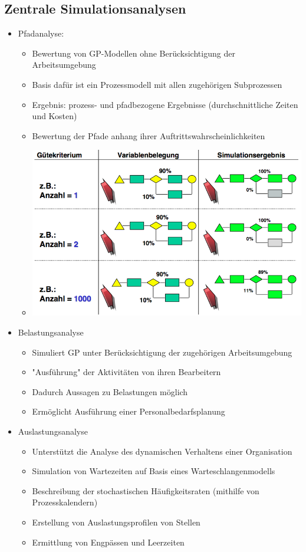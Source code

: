 \documentclass[11pt,a4paper]{article}
\begin{document}
\subsection{Zentrale Simulationsanalysen}
\begin{itemize}
\item Pfadanalyse:
	\begin{itemize}
	\item Bewertung von GP-Modellen ohne Berücksichtigung der Arbeitsumgebung
	\item Basis dafür ist ein Prozessmodell mit allen zugehörigen Subprozessen
	\item Ergebnis: prozess- und pfadbezogene Ergebnisse (durchschnittliche Zeiten und Kosten)
	\item Bewertung der Pfade anhang ihrer Auftrittswahrscheinlichkeiten
	\item[] \includegraphics[width=15cm]{pfadstat}
	\end{itemize}

\item Belastungsanalyse
	\begin{itemize}
	\item Simuliert GP unter Berücksichtigung der zugehörigen Arbeitsumgebung
	\item "Ausführung" der Aktivitäten von ihren Bearbeitern
	\item Dadurch Aussagen zu Belastungen möglich
	\item Ermöglicht Ausführung einer Personalbedarfsplanung
	\end{itemize}

\item Auslastungsanalyse
	\begin{itemize}
	\item Unterstützt die Analyse des dynamischen Verhaltens einer Organisation
	\item Simulation von Wartezeiten auf Basis eines Warteschlangenmodells
	\item Beschreibung der stochastischen Häufigkeitsraten (mithilfe von Prozesskalendern)
	\item Erstellung von Auslastungsprofilen von Stellen
	\item Ermittlung von Engpässen und Leerzeiten
	\end{itemize}


\end{itemize}
\end{document}

